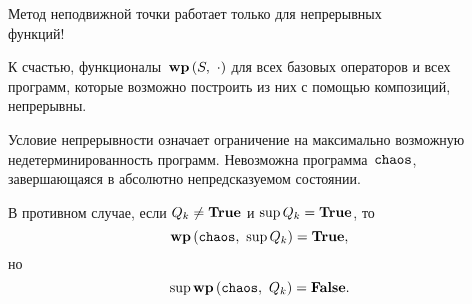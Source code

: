 \documentclass[landscape]{slides}
\begin{document}
\begin{slide}
        Метод неподвижной точки работает только для непрерывных\\функций!

        К счастью, функционалы~$\mathbf{wp}\left({S},\ {\cdot}\right)$ для всех базовых операторов и всех программ,
        которые возможно построить из них с помощью композиций, непрерывны.

        Условие непрерывности означает ограничение на максимально возможную недетерминированность
        программ. Невозможна программа~$\mathtt{chaos}$, завершающаяся в абсолютно непредсказуемом состоянии.

        В противном случае, если $Q_k\ne\mathbf{True}$ и $\sup Q_k = \mathbf{True}$, то
        \[
                \mathbf{wp}\left({\mathtt{chaos}},\ {\sup Q_k}\right) = \mathbf{True},
        \]
        но
        \[
                \sup \mathbf{wp}\left({\mathtt{chaos}},\ {Q_k}\right) = \mathbf{False}.
        \]
\end{slide}

\begin{slide}
\end{slide}

\begin{slide}
\end{slide}

\begin{slide}
\end{slide}
\end{document}
